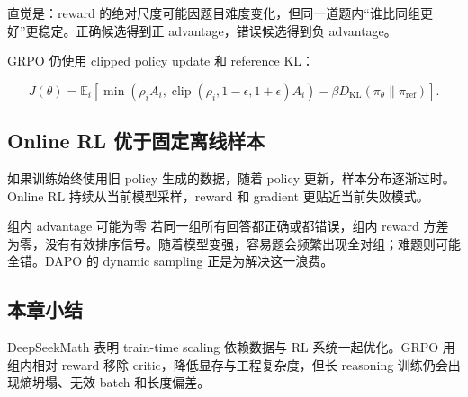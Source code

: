 直觉是：reward 的绝对尺度可能因题目难度变化，但同一道题内“谁比同组更好”更稳定。正确候选得到正 advantage，错误候选得到负 advantage。

GRPO 仍使用 clipped policy update 和 reference KL：

$$
J(\theta)=\mathbb E_i\left[
\min(\rho_i A_i,\operatorname{clip}(\rho_i,1-\epsilon,1+\epsilon)A_i)
-\beta D_{\mathrm{KL}}(\pi_\theta\|\pi_{\mathrm{ref}})
\right].
$$


\subsection{Online RL 优于固定离线样本}

如果训练始终使用旧 policy 生成的数据，随着 policy 更新，样本分布逐渐过时。Online RL 持续从当前模型采样，reward 和 gradient 更贴近当前失败模式。


\begin{warningbox}{组内 advantage 可能为零}
若同一组所有回答都正确或都错误，组内 reward 方差为零，没有有效排序信号。随着模型变强，容易题会频繁出现全对组；难题则可能全错。DAPO 的 dynamic sampling 正是为解决这一浪费。
\end{warningbox}

\subsection{本章小结}

DeepSeekMath 表明 train-time scaling 依赖数据与 RL 系统一起优化。GRPO 用组内相对 reward 移除 critic，降低显存与工程复杂度，但长 reasoning 训练仍会出现熵坍塌、无效 batch 和长度偏差。

